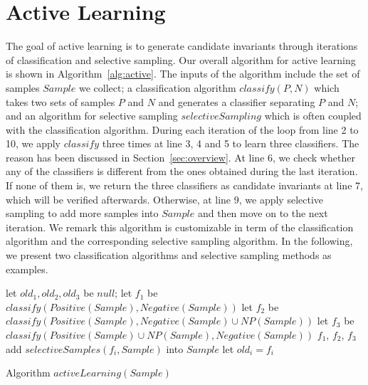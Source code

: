 
\section{Active Learning} %
\label{sec:learning}
The goal of active learning is to generate candidate invariants through iterations of classification and selective sampling. Our overall algorithm for active learning is shown in Algorithm~\ref{alg:active}. The inputs of the algorithm include the set of samples $\mathit{Sample}$ we collect; a classification algorithm $\mathit{classify}(P,N)$ which takes two sets of samples $P$ and $N$ and generates a classifier separating $P$ and $N$; and an algorithm for selective sampling $\mathit{selectiveSampling}$ which is often coupled with the classification algorithm. During each iteration of the loop from line 2 to 10, we apply $\mathit{classify}$ three times at line 3, 4 and 5 to learn three classifiers. The reason has been discussed in Section~\ref{sec:overview}. At line 6, we check whether any of the classifiers is different from the ones obtained during the last iteration. If none of them is, we return the three classifiers as candidate invariants at line 7, which will be verified afterwards. Otherwise, at line 9, we apply selective sampling to add more samples into $\mathit{Sample}$ and then move on to the next iteration. We remark this algorithm is customizable in term of the classification algorithm and the corresponding selective sampling algorithm. In the following, we present two classification algorithms and selective sampling methods as examples.

\begin{algorithm}[t]
\SetAlgoVlined
\Indm
\Indp
let $\mathit{old_1}, \mathit{old_2}, \mathit{old_3}$ be $null$;\;
 {
    let $f_1$ be $\mathit{classify}(\mathit{Positive}(\mathit{Sample}), \mathit{Negative}(\mathit{Sample}))$\;
    let $f_2$ be $\mathit{classify}(\mathit{Positive}(\mathit{Sample}), \mathit{Negative}(\mathit{Sample}) \cup \mathit{NP}(\mathit{Sample}))$\;
    let $f_3$ be $\mathit{classify}(\mathit{Positive}(\mathit{Sample}) \cup \mathit{NP}(\mathit{Sample}), \mathit{Negative}(\mathit{Sample}))$\;
     {
        \Return $f_1$, $f_2$, $f_3$\;
    }
     {
        add $\mathit{selectiveSamples}(f_i, \mathit{Sample})$ into $\mathit{Sample}$\;
        let $\mathit{old_i} = f_i$\;
    }
}
\caption{Algorithm $\mathit{activeLearning}(\mathit{Sample})$}
\label{alg:active}
\end{algorithm}


